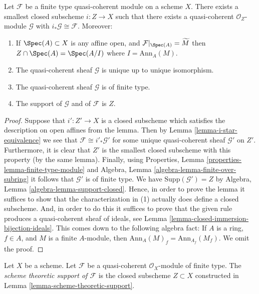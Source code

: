 \begin{lemma}
\label{lemma-scheme-theoretic-support}
Let $\mathcal{F}$ be a finite type quasi-coherent module
on a scheme $X$. There exists a smallest closed subscheme
$i : Z \to X$ such that there exists a quasi-coherent
$\mathcal{O}_Z$-module $\mathcal{G}$ with
$i_*\mathcal{G} \cong \mathcal{F}$. Moreover:
\begin{enumerate}
\item If $\Spec(A) \subset X$ is any affine open, and
$\mathcal{F}|_{\Spec(A)} = \widetilde{M}$ then
$Z \cap \Spec(A) = \Spec(A/I)$ where $I = \text{Ann}_A(M)$.
\item The quasi-coherent sheaf $\mathcal{G}$ is unique up to unique
isomorphism.
\item The quasi-coherent sheaf $\mathcal{G}$ is of finite type.
\item The support of $\mathcal{G}$ and of $\mathcal{F}$ is $Z$.
\end{enumerate}
\end{lemma}

\begin{proof}
Suppose that $i' : Z' \to X$ is a closed subscheme which satisfies the
description on open affines from the lemma. Then by
Lemma \ref{lemma-i-star-equivalence}
we see that $\mathcal{F} \cong i'_*\mathcal{G}'$ for some unique
quasi-coherent sheaf $\mathcal{G}'$ on $Z'$. Furthermore, it is clear
that $Z'$ is the smallest closed subscheme with this property (by the
same lemma). Finally, using
Properties, Lemma \ref{properties-lemma-finite-type-module}
and
Algebra, Lemma \ref{algebra-lemma-finite-over-subring}
it follows that $\mathcal{G}'$ is of finite type. We have
$\text{Supp}(\mathcal{G}') = Z$ by
Algebra, Lemma \ref{algebra-lemma-support-closed}.
Hence, in order to prove the lemma it suffices to show that
the characterization in (1) actually does define a closed subscheme.
And, in order to do this it suffices to prove that the given rule
produces a quasi-coherent sheaf of ideals, see
Lemma \ref{lemma-closed-immersion-bijection-ideals}.
This comes down to the following algebra fact: If $A$ is a ring, $f \in A$,
and $M$ is a finite $A$-module, then
$\text{Ann}_A(M)_f = \text{Ann}_{A_f}(M_f)$.
We omit the proof.
\end{proof}

\begin{definition}
\label{definition-scheme-theoretic-support}
Let $X$ be a scheme. Let $\mathcal{F}$ be a quasi-coherent
$\mathcal{O}_X$-module of finite type. The {\it scheme theoretic support
of $\mathcal{F}$} is the closed subscheme $Z \subset X$ constructed in
Lemma \ref{lemma-scheme-theoretic-support}.
\end{definition}

